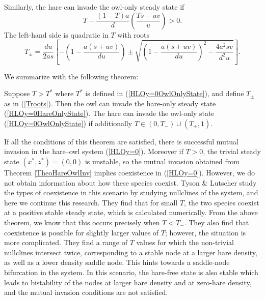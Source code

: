 \documentclass[12pt]{UOthesis}
\theoremstyle{remarkstyle}
\begin{document}
Similarly, the hare can invade the owl-only steady state if
$$T-\frac{(1-T)a}{d}\left(\frac{Ts-uv}{u}\right)>0.$$
The left-hand side is quadratic in $T$ with roots
\begin{equation}
	T_{\pm}=\frac{du}{2as}\left[-\left(1-\frac{a(s+uv)}{du}\right)\pm \sqrt{\left(1-\frac{a(s+uv)}{du}\right)^2-\frac{4a^2sv}{d^2u}}\right].
	\label{Troots}
\end{equation}

We summarize with the following theorem:
\begin{theo}
	Suppose $T>T^*$ where $T^*$ is defined in (\ref{HLOy=0OwlOnlyState}), and define $T_{\pm}$ as in (\ref{Troots}). Then the owl can invade the hare-only steady state (\ref{HLOy=0HareOnlyState}). The hare can invade the owl-only state (\ref{HLOy=0OwlOnlyState}) if additionally $T\in (0,T_-)\cup (T_+,1)$.
	\label{TheoHareOwlInv}
\end{theo}

If all the conditions of this theorem are satisfied, there is successful mutual invasion in the hare--owl system (\ref{HLOy=0}). Moreover if $T>0$, the trivial steady state $(x^*,z^*)=(0,0)$ is unstable, so the mutual invasion obtained from Theorem \ref{TheoHareOwlInv} implies coexistence in (\ref{HLOy=0}). However, we do not obtain information about how these species coexist. Tyson \& Lutscher \cite{TysonLutscher} study the types of coexistence in this scenario by studying nullclines of the system, and here we continue this research. They find that for small $T$, the two species coexist at a positive stable steady state, which is calculated numerically. From the above theorem, we know that this occurs precisely when $T<T_-$. They also find that coexistence is possible for slightly larger values of $T$; however, the situation is more complicated. They find a range of $T$ values for which the non-trivial nullclines intersect twice, corresponding to a stable node at a larger hare density, as well as a lower density saddle node. This hints towards a saddle-node bifurcation in the system. In this scenario, the hare-free state is also stable which leads to bistability of the nodes at larger hare density and at zero-hare density, and the mutual invasion conditions are not satisfied.\\
\end{document}
